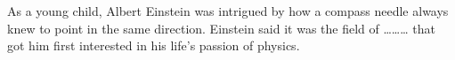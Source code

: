 As a young child, Albert Einstein was intrigued by how a compass needle always knew to point in the same direction. Einstein said it was the field of ……… that got him first interested in his life's passion of physics.